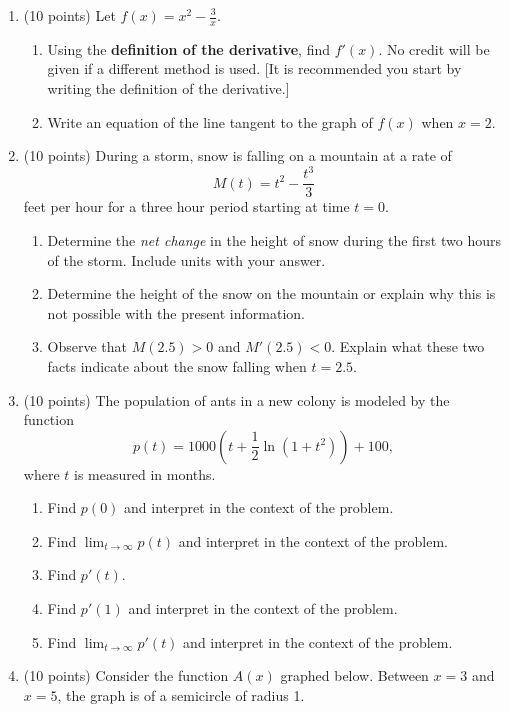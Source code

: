 \documentclass[11pt]{article}
\begin{document}
\newpage
\vspace*{-0.3in}
\begin{enumerate}
\item (10 points) Let $f(x)=x^2-\frac{3}{x}.$
	\begin{enumerate}
	\item Using the \textbf{definition of the derivative}, find $f'(x)$. No credit will be given if a different method is used. [It is recommended you start by writing the definition of the derivative.] 
	\vfill
	\item Write an equation of the line tangent to the graph of $f(x)$ when $x=2.$	
	\vspace{2in}
	\end{enumerate}
\newpage
\item (10 points) During a storm, snow is falling on a mountain at a rate of $$M(t)= t^2-\frac{t^3}{3}$$ feet per hour for a three hour period starting at time $t=0.$
	\begin{enumerate}
	\item Determine the \emph{net change} in the height of snow during the first two hours of the storm. Include  units with your answer.
	\vfill
	\item Determine the height of the snow on the mountain or explain why this is not possible with the present information.
	\vspace{2in}
	\item Observe that $M(2.5)>0$ and $M'(2.5)<0.$ Explain what these two facts indicate about the snow falling when $t=2.5.$
	\vspace{1in}
	\end{enumerate}
\newpage
\item (10 points) The population of ants in a new colony is modeled by the function
$$p(t)=1000\left(t+\frac{1}{2} \ln(1+t^2)\right)+100,$$ where $t$ is measured in months. 
	\begin{enumerate}
	\item Find $p(0)$ and interpret in the context of the problem. \\
	\vfill
	 \item Find $\displaystyle \lim_{t \to \infty} p(t)$ and interpret in the context of the problem. \\
	\vfill
	\item Find $p'(t).$ \\
	\vfill
	\item Find $p'(1)$ and interpret in the context of the problem. \\
	\vfill
	\item  Find $\displaystyle \lim_{t \to \infty} p'(t)$ and interpret in the context of the problem. \\
	\vfill
	\end{enumerate}
\newpage
\item (10 points) Consider the function $A(x)$ graphed below. Between $x=3$ and $x=5$, the graph is of a semicircle of radius 1.


\end{enumerate}
\end{document}
